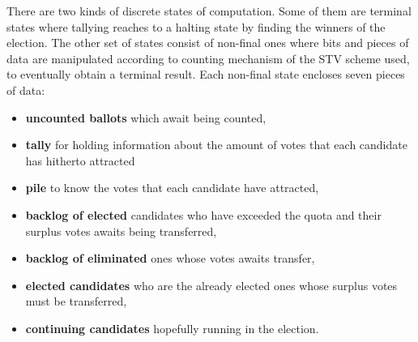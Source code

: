 \documentclass[10pt,conference]{IEEEtran}
\begin{document}
There are two kinds of discrete states of computation. Some of them are terminal states where tallying reaches to a halting state by finding the winners of the election. The other set of states consist of non-final ones where bits and pieces of data are manipulated according to counting mechanism of the STV scheme used, to eventually obtain a terminal result. Each non-final state encloses seven pieces of data: 
\begin{itemize}
 \item\textbf{uncounted ballots} which await being counted,
 \item\textbf{tally} for holding information about the amount of votes that each candidate has hitherto attracted %
 \item\textbf{pile} to know the votes that each candidate have attracted, 
 \item\textbf{backlog of elected} candidates who have exceeded the quota and their surplus votes awaits being transferred,
 \item\textbf{backlog of eliminated} ones whose votes awaits transfer,
 \item\textbf{elected candidates} who are the already elected ones whose surplus votes must be transferred,
 \item\textbf{continuing candidates} hopefully running in the election. 
 \end{itemize}
\end{document}
